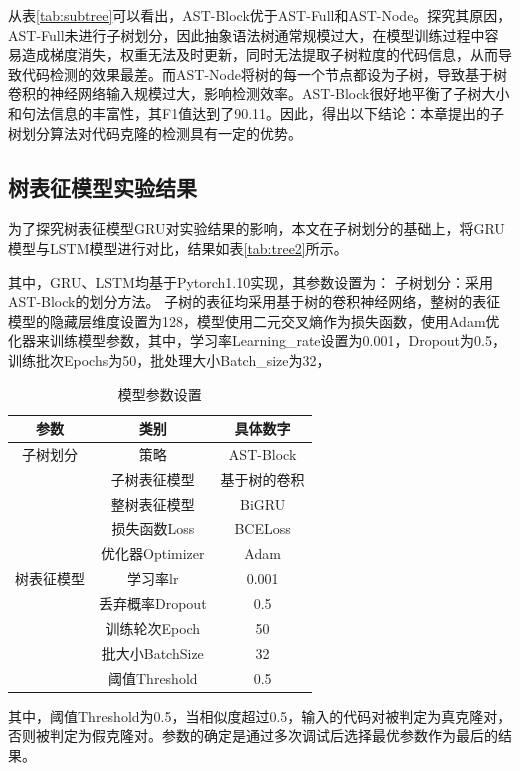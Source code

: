 从表\ref{tab:subtree}可以看出，AST-Block优于AST-Full和AST-Node。探究其原因，AST-Full未进行子树划分，因此抽象语法树通常规模过大，在模型训练过程中容易造成梯度消失，权重无法及时更新，同时无法提取子树粒度的代码信息，从而导致代码检测的效果最差。而AST-Node将树的每一个节点都设为子树，导致基于树卷积的神经网络输入规模过大，影响检测效率。AST-Block很好地平衡了子树大小和句法信息的丰富性，其F1值达到了90.11。因此，得出以下结论：本章提出的子树划分算法对代码克隆的检测具有一定的优势。

\subsection{树表征模型实验结果}
\label{subsec:TokenResult2}

为了探究树表征模型GRU对实验结果的影响，本文在子树划分的基础上，将GRU模型与LSTM模型进行对比，结果如表\ref{tab:tree2}所示。

其中，GRU、LSTM均基于Pytorch1.10实现，其参数设置为： 子树划分：采用AST-Block的划分方法。 子树的表征均采用基于树的卷积神经网络，整树的表征模型的隐藏层维度设置为128，模型使用二元交叉熵作为损失函数，使用Adam优化器来训练模型参数，其中，学习率Learning\_rate设置为0.001，Dropout为0.5，训练批次Epochs为50，批处理大小Batch\_size为32，
\begin{table}[htp] 
  \centering  
  \caption{模型参数设置}   
  \label{tab:parameter}  
  \begin{tabular*}{0.9\textwidth}{@{\extracolsep{\fill}}ccc}  
  \toprule  
  参数 & 类别 & 具体数字  \\  
  \midrule
  子树划分 &策略 	& AST-Block	 \\
  \cmidrule{2-3} 
  \multirow{9}{*}{树表征模型}   &子树表征模型 	& 基于树的卷积	 \\
  & 整树表征模型	& BiGRU		\\
  & 损失函数Loss	& BCELoss		\\
  & 优化器Optimizer	& Adam		\\  
  & 学习率lr	& 0.001		 \\  
  & 丢弃概率Dropout	& 0.5		\\
  & 训练轮次Epoch	& 50		\\
  & 批大小BatchSize	& 32	\\
  & 阈值Threshold	& 0.5		\\
  \bottomrule  
  \end{tabular*}  
\end{table}

其中，阈值Threshold为0.5，当相似度超过0.5，输入的代码对被判定为真克隆对，否则被判定为假克隆对。参数的确定是通过多次调试后选择最优参数作为最后的结果。

